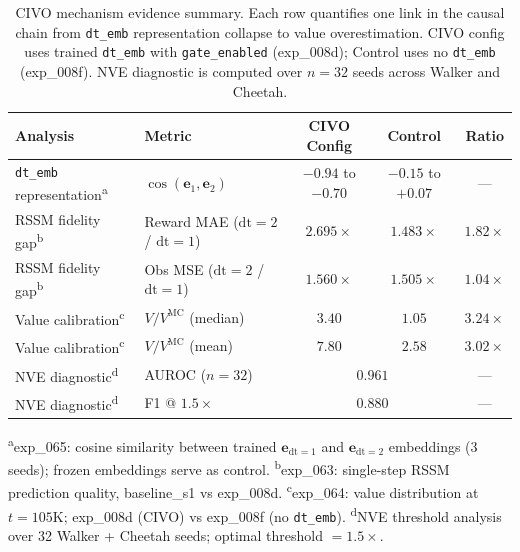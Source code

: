 \begin{table}[t]
\centering
\caption{CIVO mechanism evidence summary. Each row quantifies one link in the
causal chain from \texttt{dt\_emb} representation collapse to value
overestimation. CIVO config uses trained \texttt{dt\_emb} with
\texttt{gate\_enabled} (exp\_008d); Control uses no \texttt{dt\_emb}
(exp\_008f). NVE diagnostic is computed over $n{=}32$ seeds across Walker and
Cheetah.%
\label{tab:mechanism-evidence}}
\small
\begin{tabular}{@{}llccc@{}}
\toprule
Analysis & Metric & CIVO Config & Control & Ratio \\
\midrule
\texttt{dt\_emb} representation\textsuperscript{a}
  & $\cos(\mathbf{e}_1, \mathbf{e}_2)$
  & $-0.94$ to $-0.70$
  & $-0.15$ to $+0.07$
  & --- \\
RSSM fidelity gap\textsuperscript{b}
  & Reward MAE ($\text{dt}{=}2$ / $\text{dt}{=}1$)
  & $2.695\times$
  & $1.483\times$
  & $1.82\times$ \\
RSSM fidelity gap\textsuperscript{b}
  & Obs MSE ($\text{dt}{=}2$ / $\text{dt}{=}1$)
  & $1.560\times$
  & $1.505\times$
  & $1.04\times$ \\
Value calibration\textsuperscript{c}
  & $V / V^{\text{MC}}$ (median)
  & $3.40$
  & $1.05$
  & $3.24\times$ \\
Value calibration\textsuperscript{c}
  & $V / V^{\text{MC}}$ (mean)
  & $7.80$
  & $2.58$
  & $3.02\times$ \\
NVE diagnostic\textsuperscript{d}
  & AUROC ($n{=}32$)
  & \multicolumn{2}{c}{$0.961$}
  & --- \\
NVE diagnostic\textsuperscript{d}
  & F1 @ $1.5\times$
  & \multicolumn{2}{c}{$0.880$}
  & --- \\
\bottomrule
\end{tabular}

\vspace{2pt}
{\footnotesize
\textsuperscript{a}exp\_065: cosine similarity between trained $\mathbf{e}_{\text{dt}=1}$ and $\mathbf{e}_{\text{dt}=2}$ embeddings (3 seeds); frozen embeddings serve as control.
\textsuperscript{b}exp\_063: single-step RSSM prediction quality, baseline\_s1 vs exp\_008d.
\textsuperscript{c}exp\_064: value distribution at $t{=}105\text{K}$; exp\_008d (CIVO) vs exp\_008f (no \texttt{dt\_emb}).
\textsuperscript{d}NVE threshold analysis over 32 Walker + Cheetah seeds; optimal threshold $= 1.5\times$.
}
\end{table}
